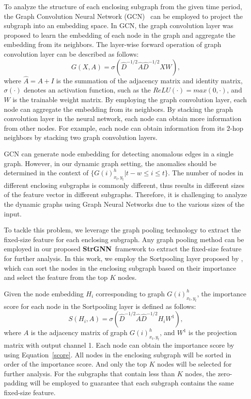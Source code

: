 \documentclass{article}
\newcommand{\model}{\textbf{StrGNN}~}
\begin{document}
To analyze the structure of each enclosing subgraph from the given time period, the Graph Convolution Neural Network (GCN)~\cite{kipf2016semi} can be employed to project the subgraph into an embedding space. In GCN, the graph convolution layer was proposed to learn the embedding of each node in the graph and aggregate the embedding from its neighbors. The layer-wise forward operation of graph convolution layer can be described as follows:
\begin{equation}
G(X,A) = \sigma(\hat{D}^{-1/2}\hat{A}\hat{D}^{-1/2}XW),
\end{equation}
where $\hat{A} = A + I $ is the summation of the adjacency matrix and identity matrix, $\sigma (\cdot)$ denotes an activation function, such as the $ReLU(\cdot) = max(0, \cdot)$, and $W$ is the trainable weight matrix. By employing the graph convolution layer, each node can aggregate the embedding from its neighbors. By stacking the graph convolution layer in the neural network, each node can obtain more information from other nodes. For example, each node can obtain information from its $2$-hop neighbors by stacking two graph convolution layers. 

GCN can generate node embedding for detecting anomalous edges in a single graph. However, in our dynamic graph setting, the anomalies should be determined in the context of $\{G(i)_{x_t, y_t}^h | t-w \leq i \leq t \}$. The number of nodes in different enclosing subgraphs is commonly different, thus results in different sizes of the feature vector in different subgraphs. Therefore, it is challenging to analyze the dynamic graphs using Graph Neural Networks due to the various sizes of the input. 

To tackle this problem, we leverage the graph pooling technology to extract the fixed-size feature for each enclosing subgraph. Any graph pooling method can be employed in our proposed \model framework to extract the fixed-size feature for further analysis. In this work, we employ the Sortpooling layer proposed by \cite{zhang2018end}, which can sort the nodes in the enclosing subgraph based on their importance and select the feature from the top $K$ nodes.

Given the node embedding $H_i$ corresponding to graph $G(i)_{x_t, y_t}^h$, the importance score for each node in the Sortpooling layer is defined as follows:
\begin{equation}\label{score}
S(H_i, A) = \sigma(\hat{D}^{-1/2}\hat{A}\hat{D}^{-1/2}H_i W^1), 
\end{equation}
where $A$ is the adjacency matrix of graph $G(i)_{x_t, y_t}^h$, and $W^1$ is the projection matrix with output channel 1. Each node can obtain the importance score by using Equation~\ref{score}. All nodes in the enclosing subgraph will be sorted in order of the importance score. And only the top $K$ nodes will be selected for further analysis. For the subgraphs that contain less than $K$ nodes, the zero-padding will be employed to guarantee that each subgraph contains the same fixed-size feature.
\end{document}
